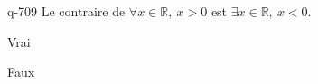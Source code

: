 \begin{truefalse}{q-709}
Le contraire de $\forall x \in \mathbb R,\: x>0$ est $\exists x \in \mathbb R,\: x< 0$.
\item Vrai
\item* Faux
\end{truefalse}

